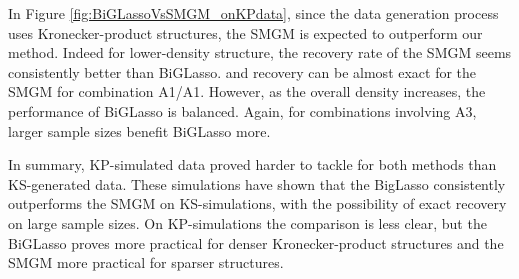     In Figure \ref{fig:BiGLassoVsSMGM_onKPdata}, since the data generation process uses Kronecker-product structures, the SMGM is expected to outperform our method.
    Indeed for lower-density structure, the recovery rate of the SMGM seems consistently better than BiGLasso.
    and recovery can be almost exact for the SMGM for combination A1/A1.
    However, as the overall density increases, the performance of BiGLasso is balanced.
    Again, for combinations involving A3, larger sample sizes benefit BiGLasso more.
    
    In summary, KP-simulated data proved harder to tackle for both methods than KS-generated data.
    These simulations have shown that the BigLasso consistently outperforms the SMGM on KS-simulations, with the possibility of exact recovery on large sample sizes.
    On KP-simulations the comparison is less clear, but the BiGLasso proves more practical for denser Kronecker-product structures and the SMGM more practical for sparser structures.
  
    
    
